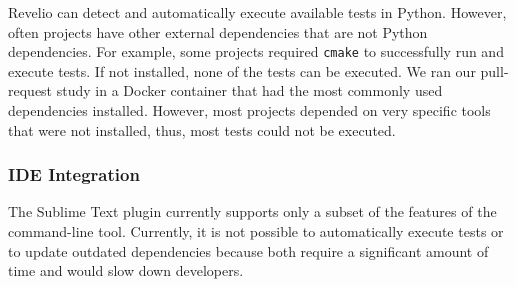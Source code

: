 Revelio can detect and automatically execute available tests in Python. However, often projects have other external dependencies that are not Python dependencies. For example, some projects required \texttt{cmake} to successfully run and execute tests. If not installed, none of the tests can be executed. We ran our pull-request study in a Docker container that had the most commonly used dependencies installed. However, most projects depended on very specific tools that were not installed, thus, most tests could not be executed.  

\subsubsection{IDE Integration}

The Sublime Text plugin currently supports only a subset of the features of the command-line tool. Currently, it is not possible to automatically execute tests or to update outdated dependencies because both require a significant amount of time and would slow down developers. 
